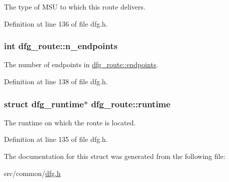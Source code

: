 The type of M\-S\-U to which this route delivers. 



Definition at line 136 of file dfg.\-h.

\hypertarget{structdfg__route_aa8015cd7ca3c4400e88120e0af74fc99}{
\subsubsection[{n\-\_\-endpoints}]{\setlength{\rightskip}{0pt plus 5cm}int dfg\-\_\-route\-::n\-\_\-endpoints}}\label{structdfg__route_aa8015cd7ca3c4400e88120e0af74fc99}


The number of endpoints in \hyperlink{structdfg__route_a6e4febfc25853befadf7dc64de1b7cff}{dfg\-\_\-route\-::endpoints}. 



Definition at line 138 of file dfg.\-h.

\hypertarget{structdfg__route_a07ec2a43f3078fc9fe4b8cc1ab0339b3}{
\subsubsection[{runtime}]{\setlength{\rightskip}{0pt plus 5cm}struct {\bf dfg\-\_\-runtime}$\ast$ dfg\-\_\-route\-::runtime}}\label{structdfg__route_a07ec2a43f3078fc9fe4b8cc1ab0339b3}


The runtime on which the route is located. 



Definition at line 135 of file dfg.\-h.



The documentation for this struct was generated from the following file\-:\begin{DoxyCompactItemize}
\item 
src/common/\hyperlink{dfg_8h}{dfg.\-h}\end{DoxyCompactItemize}
